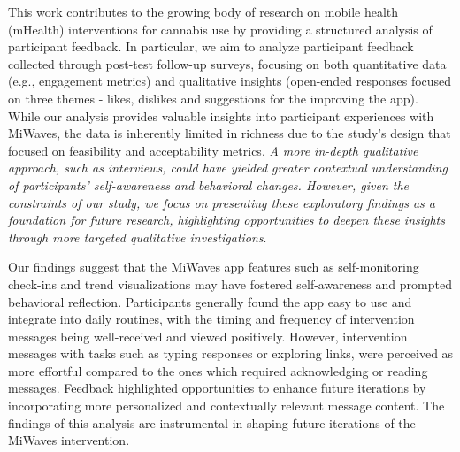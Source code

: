 This work contributes to the growing body of research on mobile health (mHealth) interventions for cannabis use by providing a structured analysis of participant feedback.
In particular, we aim to analyze participant feedback collected through post-test follow-up surveys, focusing on both quantitative data (e.g., engagement metrics) and qualitative insights (open-ended responses focused on three themes - likes, dislikes and suggestions for the improving the app). 
While our analysis provides valuable insights into participant experiences with MiWaves, the data is inherently limited in richness due to the study's design that focused on feasibility and acceptability metrics. \emph{A more in-depth qualitative approach, such as interviews, could have yielded greater contextual understanding of participants' self-awareness and behavioral changes. However, given the constraints of our study, we focus on presenting these exploratory findings as a foundation for future research, highlighting opportunities to deepen these insights through more targeted qualitative investigations}.

Our findings suggest that the MiWaves app features such as self-monitoring check-ins and trend visualizations may have fostered self-awareness and prompted behavioral reflection. Participants generally found the app easy to use and integrate into daily routines, with the timing and frequency of intervention messages being well-received and viewed positively. However, intervention messages with tasks such as typing responses or exploring links, were perceived as more
effortful compared to the ones which required acknowledging or reading messages. Feedback highlighted opportunities to enhance future iterations by incorporating more personalized and contextually relevant message content. The findings of this analysis are instrumental in shaping future iterations of the MiWaves intervention. 

